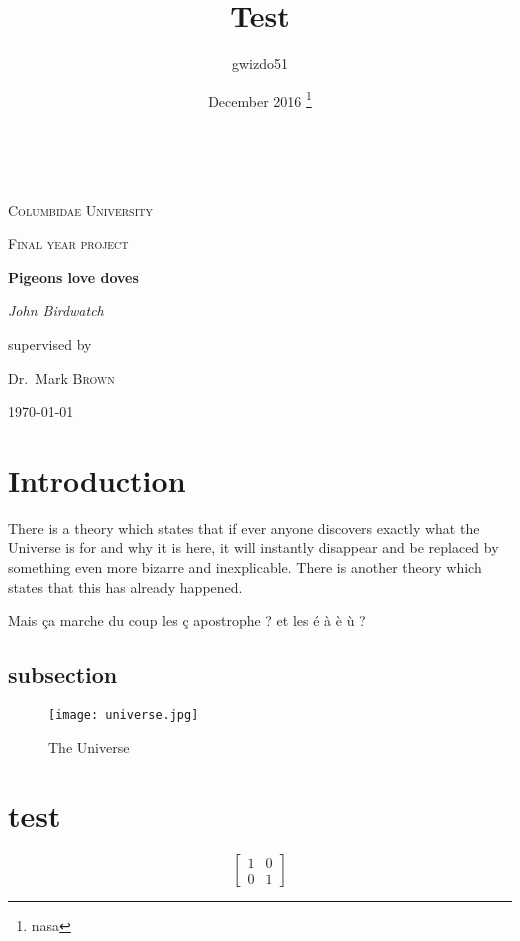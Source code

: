 \documentclass{article}
\title{Test}
\author{gwizdo51}
\date{December 2016 \thanks{nasa}}
\begin{document}
\begin{titlepage}
	\centering
	\hrulefill\\
	{\scshape\LARGE Columbidae University \par}
	\vspace{1cm}
	{\scshape\Large Final year project\par}
	\vspace{1.5cm}
	{\huge\bfseries Pigeons love doves\par}
	\vspace{2cm}
	{\Large\itshape John Birdwatch\par}
	\vfill
	supervised by\par
	Dr.~Mark \textsc{Brown}

	\vfill

	{\large \today}
\end{titlepage}

\newpage
{}
\tableofcontents
\newpage

\section{Introduction}
There is a theory which states that if ever anyone discovers exactly what the Universe is for and why it is here, it will instantly disappear and be replaced by something even more bizarre and inexplicable.
There is another theory which states that this has already happened.

Mais ça marche du coup les ç apostrophe ? et les é à è ù ?

\subsection{subsection}

\begin{figure}[h!]
\centering
\texttt{[image: universe.jpg]}
\caption{The Universe}
\label{fig:universe}
\end{figure}

\section{test}

\begin{equation}
\left[
\begin{matrix}
1 & 0\\
0 & 1
\end{matrix}
\right]
\label{matrice_ex}
\end{equation}
\end{document}
